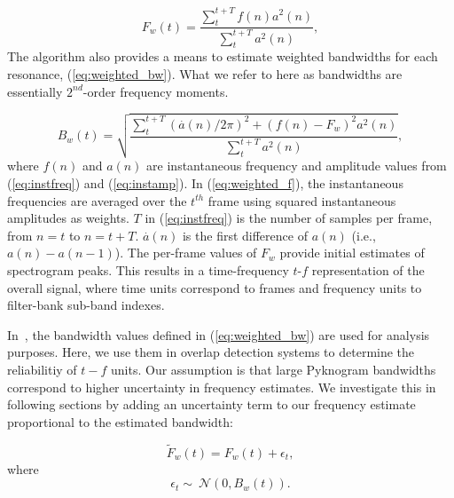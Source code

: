 {\begin{equation}
\label{eq:weighted_f}
F_w(t) = \frac{\sum_{t}^{t+T}f(n)a^2(n)}{\sum_{t}^{t+T}a^2(n)},
\end{equation}
The algorithm also provides a means to estimate weighted bandwidths for each resonance, (\ref{eq:weighted_bw}). 
What we refer to here as bandwidths are essentially $2^{nd}$-order frequency moments. 

\begin{equation}
\label{eq:weighted_bw}
B_w(t) = \sqrt{\frac{\sum_{t}^{t+T}(\overset{\boldsymbol .}{a}(n) /2\pi)^2+(f(n)-F_w)^2a^2(n)}{\sum_{t}^{t+T}a^2(n)}},
\end{equation}
where $f(n)$ and $a(n)$ are instantaneous frequency and amplitude values from (\ref{eq:instfreq}) and (\ref{eq:instamp}). 
In (\ref{eq:weighted_f}), the instantaneous frequencies are averaged over the $t^{th}$ frame using squared instantaneous amplitudes as weights. 
$T$ in (\ref{eq:instfreq}) is the number of samples per frame, from $n = t$ to $n = t+T$. 
$\overset{\boldsymbol .}{a}(n)$ is the first difference of $a(n)$ (i.e., $a(n) - a(n-1)$). 
The per-frame values of $F_w$ provide initial estimates of spectrogram peaks. 
This results in a time-frequency {$t$-$f$} representation of the overall signal, where time units correspond to frames and frequency units to filter-bank sub-band indexes. 


In~\cite{potamianos_maragos_jasa96}, the bandwidth values defined in (\ref{eq:weighted_bw}) are used for analysis purposes. 
Here, we use them in overlap detection systems to determine the reliabilitiy of $t-f$ units. 
Our assumption is that large Pyknogram bandwidths correspond to higher uncertainty in frequency estimates. 
We investigate this in following sections by adding an uncertainty term to our frequency estimate proportional to the estimated bandwidth:



\begin{equation}
\label{eq:jitter_f}
\tilde F_w(t) = F_w(t) + \epsilon_t,
\end{equation}
where
\begin{equation}
\label{eq:jitter_pdf}
\epsilon_t \sim\ \mathcal{N}(0,B_w(t)).
\end{equation}

}
